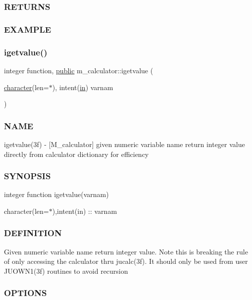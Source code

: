 \subsubsection*{R\+E\+T\+U\+R\+NS}

\subsubsection*{E\+X\+A\+M\+P\+LE}\mbox{\label{namespacem__calculator_a192c846b6a8d40ddfe603f988ff82381}} 
\subsubsection{\texorpdfstring{igetvalue()}{igetvalue()}}
{\footnotesize\ttfamily integer function, \hyperlink{M__stopwatch_83_8txt_a2f74811300c361e53b430611a7d1769f}{public} m\+\_\+calculator\+::igetvalue (\begin{DoxyParamCaption}\item[{\hyperlink{option__stopwatch_83_8txt_abd4b21fbbd175834027b5224bfe97e66}{character}(len=$\ast$), intent(\hyperlink{M__journal_83_8txt_afce72651d1eed785a2132bee863b2f38}{in})}]{varnam }\end{DoxyParamCaption})}



\subsubsection*{N\+A\+ME}

igetvalue(3f) -\/ \mbox{[}M\+\_\+calculator\mbox{]} given numeric variable name return integer value directly from calculator dictionary for efficiency \subsubsection*{S\+Y\+N\+O\+P\+S\+IS}

integer function igetvalue(varnam)

character(len=$\ast$),intent(in) \+:\+: varnam

\subsubsection*{D\+E\+F\+I\+N\+I\+T\+I\+ON}

Given numeric variable name return integer value. Note this is breaking the rule of only accessing the calculator thru jucalc(3f). It should only be used from user J\+U\+O\+W\+N1(3f) routines to avoid recursion \subsubsection*{O\+P\+T\+I\+O\+NS}

